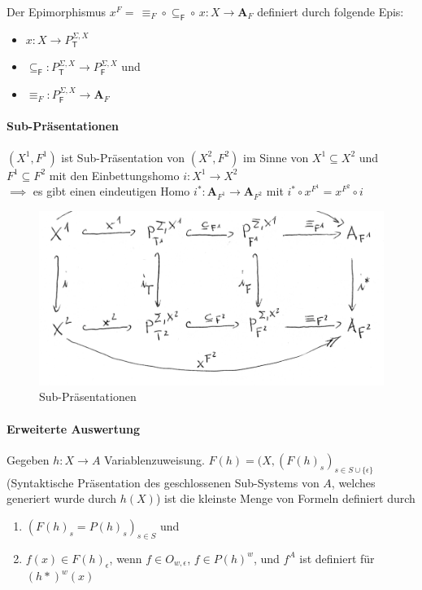 Der Epimorphismus $x^F = \, \equiv_{F}\circ\subseteq_{\mathsf{F}}\circ\, x:X\rightarrow\mathbf{A}_{F}$
definiert durch folgende Epis: %
\begin{itemize}
\item $x:X\rightarrow P_{\mathsf{T}}^{\Sigma,X}$
\item $\subseteq_{\mathsf{F}}:P_{\mathsf{T}}^{\Sigma,X}\rightarrow P_{\mathsf{F}}^{\Sigma,X}$ und 
\item $\equiv_{F}:P_{\mathsf{F}}^{\Sigma,X}\rightarrow\mathbf{A}_{F}$  
\end{itemize}
 
 \newpage 
\paragraph{ Sub-Präsentationen}
$(X^1, F^1)$ ist Sub-Präsentation von $(X^2, F^2)$ im Sinne von $X^1 \subseteq X^2$ und $F^1 \subseteq F^2$ mit den Einbettungshomo $i: X^1 \rightarrow X^2$ \\
$\implies $ es gibt einen eindeutigen Homo $i^*: \mathbf{A}_{F^1} \rightarrow \mathbf{A}_{F^2}$ mit $i^* \circ x^{F^1} = x^{F^2} \circ i$

\begin{figure}[h]
\noindent \centering{}\includegraphics[scale=0.5]{Abbildungen/180}\caption{Sub-Präsentationen}
\end{figure}

\paragraph{ Erweiterte Auswertung}
Gegeben $h: X \rightarrow A$ Variablenzuweisung. $F(h) = (X,(F(h)_s)_{s \in S \cup \{\epsilon\}}$ (Syntaktische Präsentation des geschlossenen Sub-Systems von $A$, welches generiert wurde durch $h(X)$) ist die kleinste Menge von Formeln definiert durch
\begin{enumerate}
\item $(F(h)_s = P(h)_s)_{s \in S}$ und 
\item $f(x) \in F(h)_\epsilon$, wenn $f \in O_{w, \epsilon}$, $f \in P(h)^w$, und $f^A$ ist definiert für $(h*)^w(x)$
\end{enumerate}

